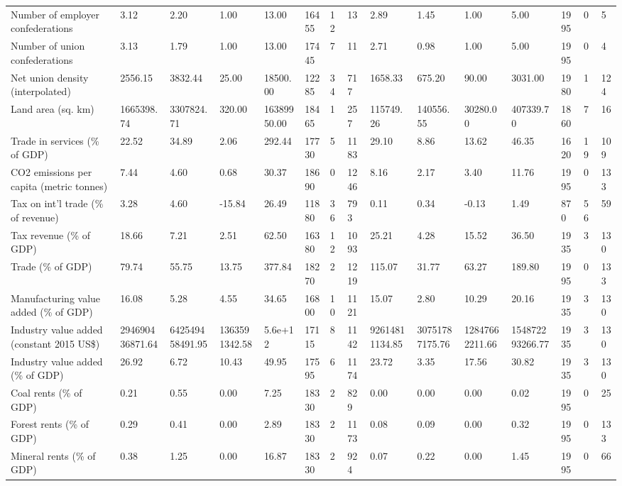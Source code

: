 \begin{longtable}{lllllllllllllll}
Number of employer confederations & 3.12 & 2.20 & 1.00 & 13.00 & 16455 & 12 & 13 & 2.89 & 1.45 & 1.00 & 5.00 & 1995 & 0 & 5\\
Number of union confederations & 3.13 & 1.79 & 1.00 & 13.00 & 17445 & 7 & 11 & 2.71 & 0.98 & 1.00 & 5.00 & 1995 & 0 & 4\\
Net union density (interpolated) & 2556.15 & 3832.44 & 25.00 & 18500.00 & 12285 & 34 & 717 & 1658.33 & 675.20 & 90.00 & 3031.00 & 1980 & 1 & 124\\
Land area (sq. km) & 1665398.74 & 3307824.71 & 320.00 & 16389950.00 & 18465 & 1 & 257 & 115749.26 & 140556.55 & 30280.00 & 407339.70 & 1860 & 7 & 16\\
\addlinespace
Trade in services (\% of GDP) & 22.52 & 34.89 & 2.06 & 292.44 & 17730 & 5 & 1183 & 29.10 & 8.86 & 13.62 & 46.35 & 1620 & 19 & 109\\
CO2 emissions per capita (metric tonnes) & 7.44 & 4.60 & 0.68 & 30.37 & 18690 & 0 & 1246 & 8.16 & 2.17 & 3.40 & 11.76 & 1995 & 0 & 133\\
Tax on int'l trade (\% of revenue) & 3.28 & 4.60 & -15.84 & 26.49 & 11880 & 36 & 793 & 0.11 & 0.34 & -0.13 & 1.49 & 870 & 56 & 59\\
Tax revenue (\% of GDP) & 18.66 & 7.21 & 2.51 & 62.50 & 16380 & 12 & 1093 & 25.21 & 4.28 & 15.52 & 36.50 & 1935 & 3 & 130\\
Trade (\% of GDP) & 79.74 & 55.75 & 13.75 & 377.84 & 18270 & 2 & 1219 & 115.07 & 31.77 & 63.27 & 189.80 & 1995 & 0 & 133\\
\addlinespace
Manufacturing value added (\% of GDP) & 16.08 & 5.28 & 4.55 & 34.65 & 16800 & 10 & 1121 & 15.07 & 2.80 & 10.29 & 20.16 & 1935 & 3 & 130\\
Industry value added (constant 2015 US\$) & 294690436871.64 & 642549458491.95 & 1363591342.58 & 5.6e+12 & 17115 & 8 & 1142 & 92614811134.85 & 30751787175.76 & 12847662211.66 & 154872293266.77 & 1935 & 3 & 130\\
Industry value added (\% of GDP) & 26.92 & 6.72 & 10.43 & 49.95 & 17595 & 6 & 1174 & 23.72 & 3.35 & 17.56 & 30.82 & 1935 & 3 & 130\\
Coal rents (\% of GDP) & 0.21 & 0.55 & 0.00 & 7.25 & 18330 & 2 & 829 & 0.00 & 0.00 & 0.00 & 0.02 & 1995 & 0 & 25\\
Forest rents (\% of GDP) & 0.29 & 0.41 & 0.00 & 2.89 & 18330 & 2 & 1173 & 0.08 & 0.09 & 0.00 & 0.32 & 1995 & 0 & 133\\
\addlinespace
Mineral rents (\% of GDP) & 0.38 & 1.25 & 0.00 & 16.87 & 18330 & 2 & 924 & 0.07 & 0.22 & 0.00 & 1.45 & 1995 & 0 & 66\\

\end{longtable}
